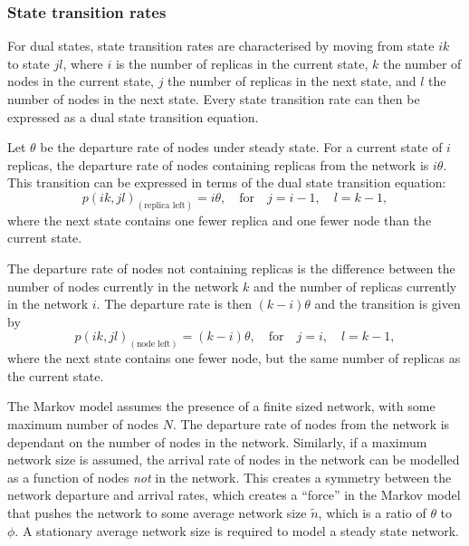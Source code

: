 \subsubsection{State transition rates}
\label{state_transition_rates}

For dual states, state transition rates are characterised by moving from state $i k$ to state $j l$, where $i$ is the number of replicas in the current state, $k$ the number of nodes in the current state, $j$ the number of replicas in the next state, and $l$ the number of nodes in the next state. Every state transition rate can then be expressed as a dual state transition equation.

Let $\theta$ be the departure rate of nodes under steady state. For a current state of $i$ replicas, the departure rate of nodes containing replicas from the network is $i\theta$. This transition can be expressed in terms of the dual state transition equation:
%
\begin{equation} \label{eq_rep_left}
    p(i k,j l)_{(\textrm{replica left})} = i\theta,\quad\textrm{for}\quad j = i - 1,\quad l = k - 1,
\end{equation}
%
where the next state contains one fewer replica and one fewer node than the current state.

The departure rate of nodes not containing replicas is the difference between the number of nodes currently in the network $k$ and the number of replicas currently in the network $i$. The departure rate is then $(k - i)\theta$ and the transition is given by
%
\begin{equation} \label{eq_node_left}
    p(i k,j l)_{(\textrm{node left})} = (k - i)\theta,\quad\textrm{for}\quad j = i,\quad l = k - 1,
\end{equation}
%
where the next state contains one fewer node, but the same number of replicas as the current state.

The Markov model assumes the presence of a finite sized network, with some maximum number of nodes $N$. The departure rate of nodes from the network is dependant on the number of nodes in the network. Similarly, if a maximum network size is assumed, the arrival rate of nodes in the network can be modelled as a function of nodes \emph{not} in the network. This creates a symmetry between the network departure and arrival rates, which creates a ``force'' in the Markov model that pushes the network to some average network size $\tilde{n}$, which is a ratio of $\theta$ to $\phi$. A stationary average network size is required to model a steady state network.

